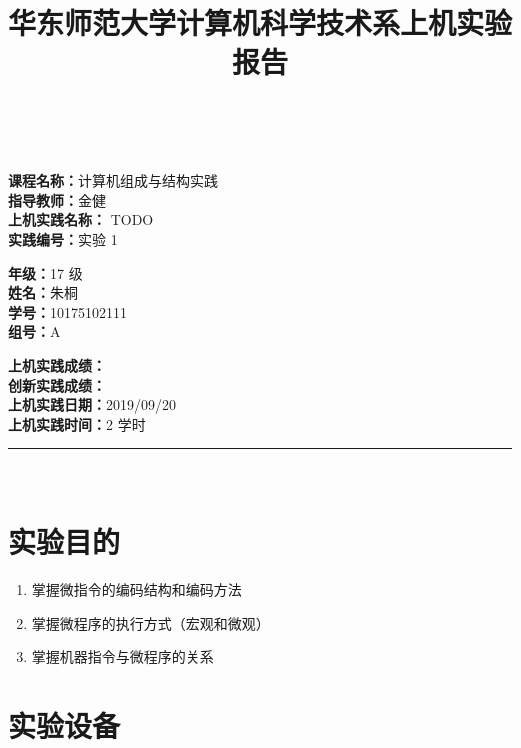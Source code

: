 \documentclass[a4paper,10pt,UTF8]{paper}
\title{华东师范大学计算机科学技术系上机实验报告}
\numberwithin{equation}{section}
\numberwithin{figure}{section}
\begin{document}
\pagestyle{fancy}
\lhead{}
\rhead{}
\makeatletter
\def\headrule{{\if@fancyplain\let\headrulewidth\plainheadrulewidth\fi%
	\color{gray}\hrule\@height 0.2pt\@width\headwidth}
	\vspace{6mm}}
\makeatother

\newcommand{\HRule}{\rule{\linewidth}{1mm}}
\newcommand{\dai}{\textbf{Dais-CMX16$^+$}}

{ \\ [0.8cm]
	
	\small{
		\begin{minipage}[t]{.32\linewidth}
			\textbf{课程名称：}计算机组成与结构实践\\
			\textbf{指导教师：}金健\\
			\textbf{上机实践名称：} TODO\\
			\textbf{实践编号：}实验 1
		\end{minipage}
		\begin{minipage}[t]{.32\linewidth}
			\textbf{年级：}17 级\\
			\textbf{姓名：}朱桐\\
			\textbf{学号：}10175102111\\
			\textbf{组号：}A
		\end{minipage} 
		\begin{minipage}[t]{.32\linewidth}
			\textbf{上机实践成绩：} \\
			\textbf{创新实践成绩：} \\
			\textbf{上机实践日期：}2019/09/20\\
			\textbf{上机实践时间：}2 学时\\
		\end{minipage}
	}
	\HRule \\[0.5cm]
}
\section{实验目的}

\begin{enumerate}
	\item 掌握微指令的编码结构和编码方法
	\item 掌握微程序的执行方式（宏观和微观）
	\item 掌握机器指令与微程序的关系
\end{enumerate}

\section{实验设备}
\end{document}
